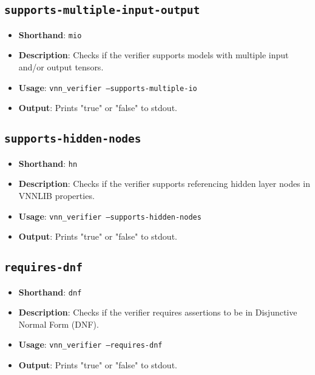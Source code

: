 \subsection{\texttt{supports-multiple-input-output}}
\begin{itemize}
    \item \textbf{Shorthand}: \texttt{mio}
    \item \textbf{Description}: Checks if the verifier supports models with multiple input and/or output tensors. 
    \item \textbf{Usage}: \texttt{vnn\_verifier --supports-multiple-io}
    \item \textbf{Output}: Prints "true" or "false" to stdout.
\end{itemize}

\subsection{\texttt{supports-hidden-nodes}}
\begin{itemize}
    \item \textbf{Shorthand}: \texttt{hn}
    \item \textbf{Description}: Checks if the verifier supports referencing hidden layer nodes in VNNLIB properties. 
    \item \textbf{Usage}: \texttt{vnn\_verifier --supports-hidden-nodes}
    \item \textbf{Output}: Prints "true" or "false" to stdout.
\end{itemize}

\subsection{\texttt{requires-dnf}}
\begin{itemize}
    \item \textbf{Shorthand}: \texttt{dnf}
    \item \textbf{Description}: Checks if the verifier requires assertions to be in Disjunctive Normal Form (DNF). 
    \item \textbf{Usage}: \texttt{vnn\_verifier --requires-dnf}
    \item \textbf{Output}: Prints "true" or "false" to stdout.
\end{itemize}


